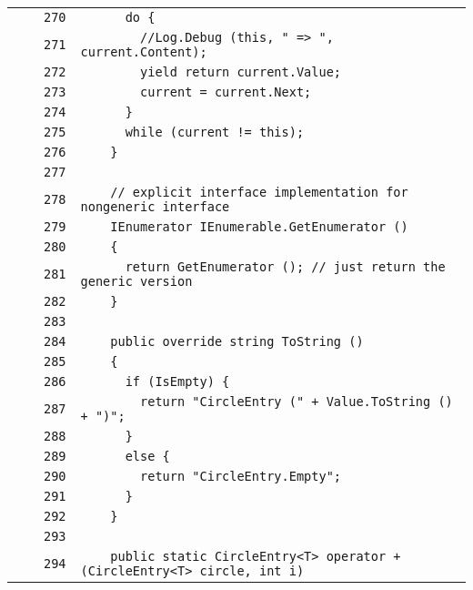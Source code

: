 \documentclass[a4paper,10pt]{article}
\begin{document}
\begin{longtable}[l]{lrrl}
\cellcolor{gray} &  & \verb~270~ & \verb~      do {~\\
\cellcolor{gray} &  & \verb~271~ & \verb~        //Log.Debug (this, " => ", current.Content);~\\
\cellcolor{gray} &  & \verb~272~ & \verb~        yield return current.Value;~\\
\cellcolor{gray} &  & \verb~273~ & \verb~        current = current.Next;~\\
\cellcolor{gray} &  & \verb~274~ & \verb~      }~\\
\cellcolor{gray} &  & \verb~275~ & \verb~      while (current != this);~\\
\cellcolor{gray} &  & \verb~276~ & \verb~    }~\\
\cellcolor{gray} &  & \verb~277~ & \verb~~\\
\cellcolor{gray} &  & \verb~278~ & \verb~    // explicit interface implementation for nongeneric interface~\\
\cellcolor{gray} &  & \verb~279~ & \verb~    IEnumerator IEnumerable.GetEnumerator ()~\\
\cellcolor{gray} &  & \verb~280~ & \verb~    {~\\
\cellcolor{gray} &  & \verb~281~ & \verb~      return GetEnumerator (); // just return the generic version~\\
\cellcolor{gray} &  & \verb~282~ & \verb~    }~\\
\cellcolor{gray} &  & \verb~283~ & \verb~~\\
\cellcolor{gray} &  & \verb~284~ & \verb~    public override string ToString ()~\\
\cellcolor{gray} &  & \verb~285~ & \verb~    {~\\
\cellcolor{gray} &  & \verb~286~ & \verb~      if (IsEmpty) {~\\
\cellcolor{gray} &  & \verb~287~ & \verb~        return "CircleEntry (" + Value.ToString () + ")";~\\
\cellcolor{gray} &  & \verb~288~ & \verb~      }~\\
\cellcolor{gray} &  & \verb~289~ & \verb~      else {~\\
\cellcolor{gray} &  & \verb~290~ & \verb~        return "CircleEntry.Empty";~\\
\cellcolor{gray} &  & \verb~291~ & \verb~      }~\\
\cellcolor{gray} &  & \verb~292~ & \verb~    }~\\
\cellcolor{gray} &  & \verb~293~ & \verb~~\\
\cellcolor{gray} &  & \verb~294~ & \verb~    public static CircleEntry<T> operator + (CircleEntry<T> circle, int i)~\\

\end{longtable}
\end{document}

